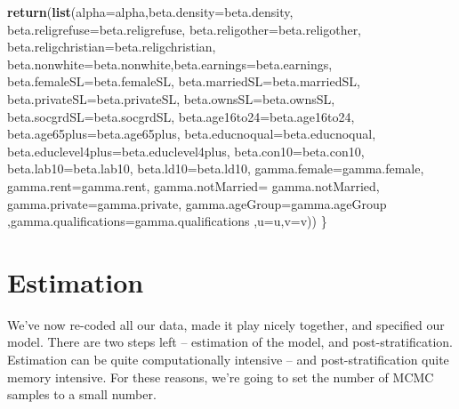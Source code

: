 \documentclass[12pt,twoside]{article}
\newenvironment{Shaded}{}{}
\newcommand{\KeywordTok}[1]{\textcolor[rgb]{0.00,0.44,0.13}{\textbf{{#1}}}}
\newcommand{\DataTypeTok}[1]{\textcolor[rgb]{0.56,0.13,0.00}{{#1}}}
\newcommand{\NormalTok}[1]{{#1}}
\begin{document}
\begin{Shaded}
\begin{Highlighting}[]
            \KeywordTok{return}\NormalTok{(}\KeywordTok{list}\NormalTok{(}\DataTypeTok{alpha=}\NormalTok{alpha,}\DataTypeTok{beta.density=}\NormalTok{beta.density,}
                        \DataTypeTok{beta.religrefuse=}\NormalTok{beta.religrefuse,}
                        \DataTypeTok{beta.religother=}\NormalTok{beta.religother,}
                        \DataTypeTok{beta.religchristian=}\NormalTok{beta.religchristian,}
                        \DataTypeTok{beta.nonwhite=}\NormalTok{beta.nonwhite,}\DataTypeTok{beta.earnings=}\NormalTok{beta.earnings,}
                        \DataTypeTok{beta.femaleSL=}\NormalTok{beta.femaleSL, }\DataTypeTok{beta.marriedSL=}\NormalTok{beta.marriedSL,}
                        \DataTypeTok{beta.privateSL=}\NormalTok{beta.privateSL, }\DataTypeTok{beta.ownsSL=}\NormalTok{beta.ownsSL,}
                        \DataTypeTok{beta.socgrdSL=}\NormalTok{beta.socgrdSL,}
                        \DataTypeTok{beta.age16to24=}\NormalTok{beta.age16to24,}
                        \DataTypeTok{beta.age65plus=}\NormalTok{beta.age65plus,}
                        \DataTypeTok{beta.educnoqual=}\NormalTok{beta.educnoqual,}
                        \DataTypeTok{beta.educlevel4plus=}\NormalTok{beta.educlevel4plus,}
                        \DataTypeTok{beta.con10=}\NormalTok{beta.con10,}
                        \DataTypeTok{beta.lab10=}\NormalTok{beta.lab10,}
                        \DataTypeTok{beta.ld10=}\NormalTok{beta.ld10,}
                        \DataTypeTok{gamma.female=}\NormalTok{gamma.female,}
                        \DataTypeTok{gamma.rent=}\NormalTok{gamma.rent,}
                        \DataTypeTok{gamma.notMarried=} \NormalTok{gamma.notMarried,}
                        \DataTypeTok{gamma.private=}\NormalTok{gamma.private,}
                        \DataTypeTok{gamma.ageGroup=}\NormalTok{gamma.ageGroup}
                        \NormalTok{,}\DataTypeTok{gamma.qualifications=}\NormalTok{gamma.qualifications}
                        \NormalTok{,}\DataTypeTok{u=}\NormalTok{u,}\DataTypeTok{v=}\NormalTok{v))}
        \NormalTok{\}}
\end{Highlighting}
\end{Shaded}

\section{Estimation}\label{estimation}

We've now re-coded all our data, made it play nicely together, and
specified our model. There are two steps left -- estimation of the
model, and post-stratification. Estimation can be quite computationally
intensive -- and post-stratification quite memory intensive. For these
reasons, we're going to set the number of MCMC samples to a small
number.
\end{document}
